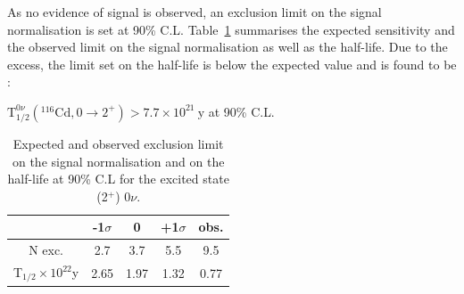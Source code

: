\documentclass[main.tex]{subfiles}
\begin{document}
\bigskip


\NI As no evidence of signal is observed, an exclusion limit on the signal normalisation is set at 90\% C.L. Table~\ref{Tab:FinalResultsbb0nu2} summarises the expected sensitivity and the observed limit on the signal normalisation as well as the half-life. Due to the excess, the limit set on the half-life is below the expected value and is found to be : 


\begin{center}
$ \text{T}_{\text{1/2}}^{\text{0}\nu} (^{\text{116}} \text{Cd}, \text{0} \rightarrow \text{2}^{+}) > \text{7.7} \times \text{10}^{\text{21}}~\text{y}$ at 90\% C.L.
\end{center}


\begin{table}
\centering
\begin{tabular}{c|c|c|c||c}
                                                & -1$\sigma$ & 0        & +1$\sigma$ & obs.     \\[0.2cm]
\hline
N exc.                                          & 2.7        & 3.7      & 5.5        & 9.5      \\[0.2cm]
T$_{\text{1/2}} \times \text{10}^{\text{22}}$y  & 2.65       & 1.97     & 1.32       & 0.77      \\[0.2cm]
\hline
\end{tabular}
\caption{Expected and observed exclusion limit on the signal normalisation and on the half-life at 90\% C.L for the excited state (2$^+$) 0$\nu$.}
\label{Tab:FinalResultsbb0nu2}
\end{table}
\end{document}
